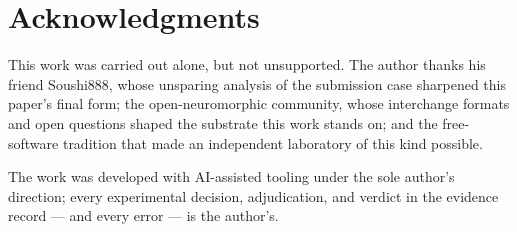\section*{Acknowledgments}
This work was carried out alone, but not unsupported. The
author thanks his friend Soushi888, whose unsparing analysis
of the submission case sharpened this paper's final form; the
open-neuromorphic community, whose interchange formats and open
questions shaped the substrate this work stands on; and the
free-software tradition that made an independent laboratory of
this kind possible.

The work was developed with AI-assisted tooling under the sole
author's direction; every experimental decision, adjudication, and
verdict in the evidence record --- and every error --- is the
author's.
